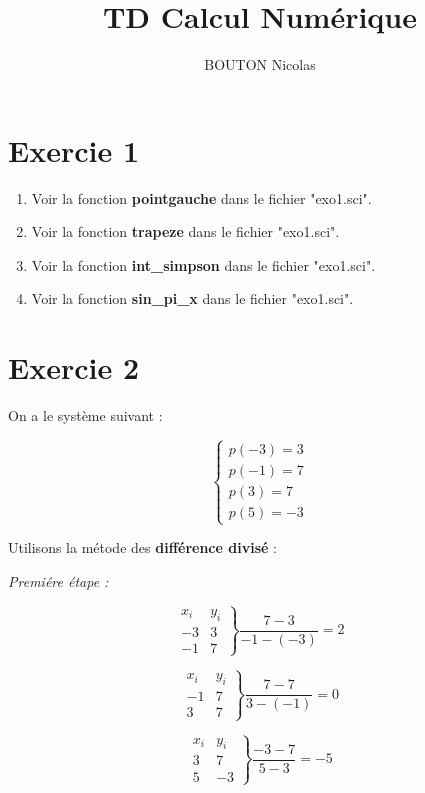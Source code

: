 \documentclass[12pt, letterpaper]{article}
\title{TD Calcul Numérique}
\author{BOUTON Nicolas}
\begin{document}
\maketitle

\section{Exercie 1}

\begin{enumerate}
\item Voir la fonction \textbf{pointgauche} dans le fichier "exo1.sci".
\item Voir la fonction \textbf{trapeze} dans le fichier "exo1.sci".
\item Voir la fonction \textbf{int\_simpson} dans le fichier "exo1.sci".
\item Voir la fonction \textbf{sin\_pi\_x} dans le fichier "exo1.sci".
\end{enumerate}

\section{Exercie 2}

On a le système suivant :

$$
\left\{
\begin{array}{l}
  p(-3) = 3 \\
  p(-1) = 7 \\
  p(3) = 7 \\
  p(5) = -3
\end{array}
\right.
$$

Utilisons la métode des \textbf{différence divisé} :

\textit{Premiére étape :}

$$
\left.
\begin{array}{ll}
  x_i & y_i \\
  -3 & 3 \\
  -1 & 7
\end{array}
\right\}
\frac{7 - 3}{-1 - (-3)} = 2
$$

$$
\left.
\begin{array}{ll}
  x_i & y_i \\
  -1 & 7 \\
  3 & 7
\end{array}
\right\}
\frac{7 - 7}{3 - (-1)} = 0
$$

$$
\left.
\begin{array}{ll}
  x_i & y_i \\
  3 & 7 \\
  5 & -3
\end{array}
\right\}
\frac{-3 - 7}{5 - 3} = -5
$$
\end{document}
